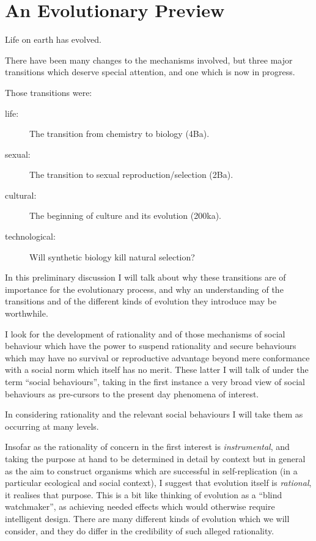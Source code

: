 \documentclass[10pt,titlepage]{book}
\begin{document}
\section{An Evolutionary Preview}

Life on earth has evolved.

There have been many changes to the mechanisms involved, but three major transitions which deserve special attention, and one which is now in progress.

Those transitions were:

\begin{description}
\item[life:] The transition from chemistry to biology (4Ba).
\item[sexual:] The transition to sexual reproduction/selection (2Ba).
\item[cultural:] The beginning of culture and its evolution (200ka).
\item[technological:] Will synthetic biology kill natural selection?
\end{description}

In this preliminary discussion I will talk about why these transitions are of importance for the evolutionary process, and why an understanding of the transitions and of the different kinds of evolution they introduce may be worthwhile.

I look for the development of rationality and of those mechanisms of social behaviour which have the power to suspend rationality and secure behaviours which may have no survival or reproductive advantage beyond mere conformance with a social norm which itself has no merit.
These latter I will talk of under the term ``social behaviours'', taking in the first instance a very broad view of social behaviours as pre-cursors to the present day phenomena of interest.

In considering rationality and the relevant social behaviours I will take them as occurring at many levels.

Insofar as the rationality of concern in the first interest is \emph{instrumental}, and taking the purpose at hand to be determined in detail by context but in general as the aim to construct organisms which are successful in self-replication (in a particular ecological and social context), I suggest that evolution itself is \emph{rational}, it realises that purpose.
This is a bit like thinking of evolution as a ``blind watchmaker'', as achieving needed effects which would otherwise require intelligent design.
There are many different kinds of evolution which we will consider, and they do differ in the credibility of such alleged rationality.
\end{document}
